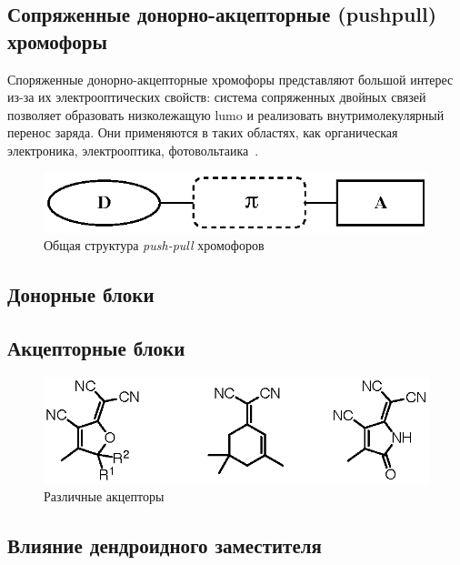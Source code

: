 \subsection{Сопряженные донорно-акцепторные (\ac{pushpull}) хромофоры}

Споряженные донорно-акцепторные хромофоры представляют большой интерес из-за их электрооптических свойств: система сопряженных двойных связей позволяет образовать низколежащую \ac{lumo} и реализовать внутримолекулярный перенос заряда. Они применяются в таких областях, как органическая электроника, электрооптика, фотовольтаика~\cite{Bures2014a}.

\begin{figure}
    \centering
    \includegraphics{sections/literature/img/D-p-A_chromophores.eps}
    \caption{Общая структура \emph{push-pull} хромофоров}
    \label{fig:D-p-A_chromophores}
\end{figure}

\subsection{Донорные блоки}

\subsection{Акцепторные блоки}

\begin{figure}
    \centering
    \includegraphics{sections/literature/img/acceptors.eps}
    \caption{Различные акцепторы~\cite{Dalton2010a}}
    \label{fig:acceptors}
\end{figure}

\subsection{Влияние дендроидного заместителя}

